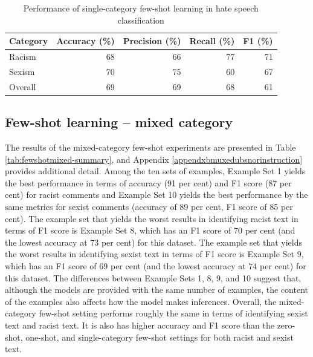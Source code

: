 \documentclass[12pt,]{article}
\begin{document}
\begin{table}

\caption{\label{tab:fewshotsingle-summary}Performance of single-category few-shot learning in hate speech classification}
\centering
\begin{tabular}[t]{lrrrr}
\toprule
Category & Accuracy (\%) & Precision (\%) & Recall (\%) & F1 (\%)\\
\midrule
Racism & 68 & 66 & 77 & 71\\
Sexism & 70 & 75 & 60 & 67\\
Overall & 69 & 69 & 68 & 61\\
\bottomrule
\end{tabular}
\end{table}

\hypertarget{few-shot-learning-mixed-category}{%
\subsection{Few-shot learning -- mixed category}\label{few-shot-learning-mixed-category}}

The results of the mixed-category few-shot experiments are presented in Table \ref{tab:fewshotmixed-summary}, and Appendix \ref{appendxbmuxedubsnorinstruction} provides additional detail. Among the ten sets of examples, Example Set 1 yields the best performance in terms of accuracy (91 per cent) and F1 score (87 per cent) for racist comments and Example Set 10 yields the best performance by the same metrics for sexist comments (accuracy of 89 per cent, F1 score of 85 per cent). The example set that yields the worst results in identifying racist text in terms of F1 score is Example Set 8, which has an F1 score of 70 per cent (and the lowest accuracy at 73 per cent) for this dataset. The example set that yields the worst results in identifying sexist text in terms of F1 score is Example Set 9, which has an F1 score of 69 per cent (and the lowest accuracy at 74 per cent) for this dataset. The differences between Example Sets 1, 8, 9, and 10 suggest that, although the models are provided with the same number of examples, the content of the examples also affects how the model makes inferences. Overall, the mixed-category few-shot setting performs roughly the same in terms of identifying sexist text and racist text. It is also has higher accuracy and F1 score than the zero-shot, one-shot, and single-category few-shot settings for both racist and sexist text.
\end{document}

